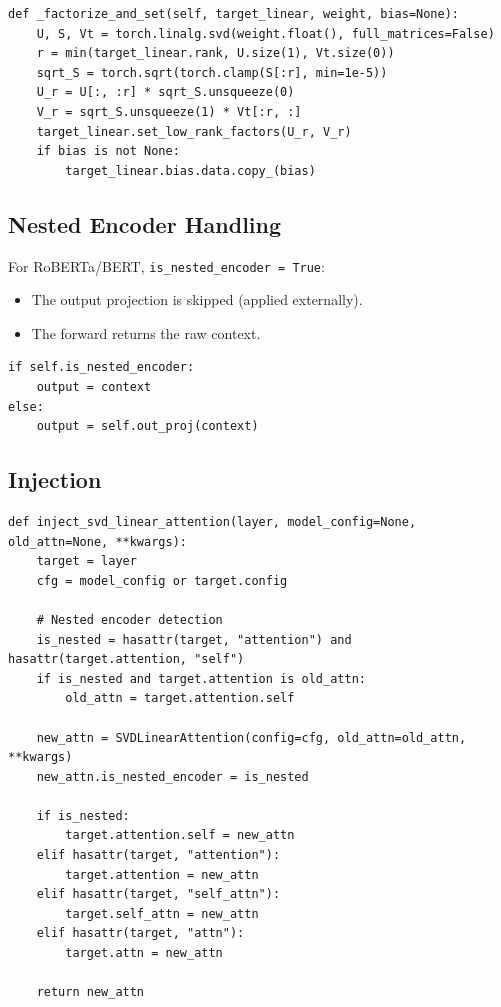 \begin{lstlisting}
def _factorize_and_set(self, target_linear, weight, bias=None):
    U, S, Vt = torch.linalg.svd(weight.float(), full_matrices=False)
    r = min(target_linear.rank, U.size(1), Vt.size(0))
    sqrt_S = torch.sqrt(torch.clamp(S[:r], min=1e-5))
    U_r = U[:, :r] * sqrt_S.unsqueeze(0)
    V_r = sqrt_S.unsqueeze(1) * Vt[:r, :]
    target_linear.set_low_rank_factors(U_r, V_r)
    if bias is not None:
        target_linear.bias.data.copy_(bias)
\end{lstlisting}

\subsection{Nested Encoder Handling}

For RoBERTa/BERT, \texttt{is\_nested\_encoder = True}:
\begin{itemize}
\item The output projection is skipped (applied externally).
\item The forward returns the raw context.

\end{itemize}
\begin{lstlisting}
if self.is_nested_encoder:
    output = context
else:
    output = self.out_proj(context)
\end{lstlisting}

\subsection{Injection}

\begin{lstlisting}
def inject_svd_linear_attention(layer, model_config=None, old_attn=None, **kwargs):
    target = layer
    cfg = model_config or target.config
    
    # Nested encoder detection
    is_nested = hasattr(target, "attention") and hasattr(target.attention, "self")
    if is_nested and target.attention is old_attn:
        old_attn = target.attention.self
    
    new_attn = SVDLinearAttention(config=cfg, old_attn=old_attn, **kwargs)
    new_attn.is_nested_encoder = is_nested
    
    if is_nested:
        target.attention.self = new_attn
    elif hasattr(target, "attention"):
        target.attention = new_attn
    elif hasattr(target, "self_attn"):
        target.self_attn = new_attn
    elif hasattr(target, "attn"):
        target.attn = new_attn
    
    return new_attn
\end{lstlisting}

